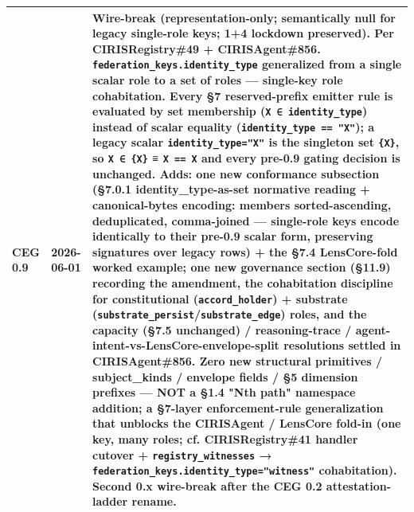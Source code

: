 \documentclass[10pt]{article}
\begin{document}
{\begin{longtable}{|p{5.33cm}|p{5.33cm}|p{5.33cm}|}
\textbf{CEG 0.9} & \textbf{2026-06-01} & \textbf{Wire-break (representation-only; semantically null for legacy single-role keys; 1+4 lockdown preserved). Per CIRISRegistry\#49 + CIRISAgent\#856.} \texttt{federation\_keys.identity\_type} generalized from a single scalar role to a \textbf{set of roles} — single-key role cohabitation. Every §7 reserved-prefix emitter rule is evaluated by set membership (\texttt{X ∈ identity\_type}) instead of scalar equality (\texttt{identity\_type == "X"}); a legacy scalar \texttt{identity\_type="X"} is the singleton set \texttt{\{X\}}, so \texttt{X ∈ \{X\}} ≡ \texttt{X == X} and every pre-0.9 gating decision is unchanged. Adds: \textbf{one new conformance subsection} (§7.0.1 identity\_type-as-set normative reading + canonical-bytes encoding: members sorted-ascending, deduplicated, comma-joined — single-role keys encode identically to their pre-0.9 scalar form, preserving signatures over legacy rows) + the §7.4 LensCore-fold worked example; \textbf{one new governance section} (§11.9) recording the amendment, the cohabitation discipline for constitutional (\texttt{accord\_holder}) + substrate (\texttt{substrate\_persist}/\texttt{substrate\_edge}) roles, and the capacity (§7.5 unchanged) / reasoning-trace / agent-intent-vs-LensCore-envelope-split resolutions settled in CIRISAgent\#856. \textbf{Zero new structural primitives / subject\_kinds / envelope fields / §5 dimension prefixes} — NOT a §1.4 "Nth path" namespace addition; a §7-layer enforcement-rule generalization that unblocks the CIRISAgent / LensCore fold-in (one key, many roles; cf. CIRISRegistry\#41 handler cutover + \texttt{registry\_witnesses} → \texttt{federation\_keys.identity\_type="witness"} cohabitation). Second 0.x wire-break after the CEG 0.2 attestation-ladder rename. \\ \hline

\end{longtable}}
\end{document}
